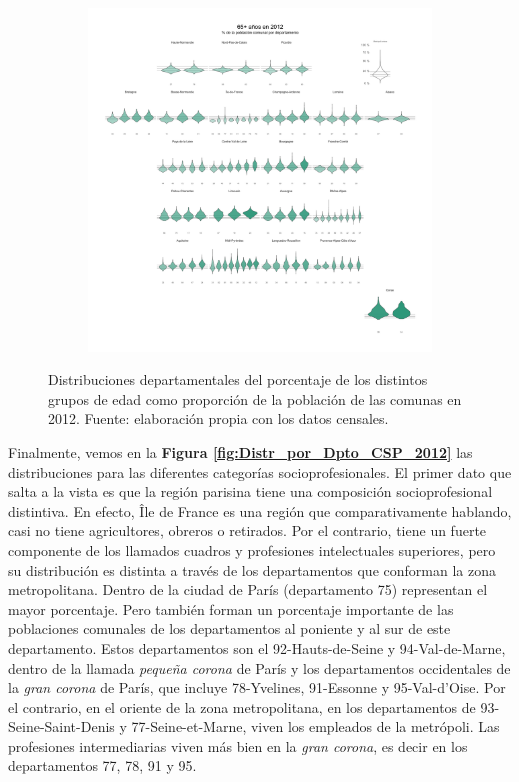 \begin{figure}[h]
\begin{subfigure}{0.3\textwidth}
	\end{subfigure}
	~
	\begin{subfigure}{0.3\textwidth}
	\includegraphics[width = \textwidth]{Figs/AED/Geofacet_Distr_por_Dpto_Ed6_2012}
	\end{subfigure}
	\caption{Distribuciones departamentales del porcentaje de los distintos grupos de edad como proporción de la población de las comunas en 2012. Fuente: elaboración propia con los datos censales.}
	\label{fig:Distr_por_Dpto_Edades_2012}	
\end{figure}

Finalmente, vemos en la \textbf{Figura \ref{fig:Distr_por_Dpto_CSP_2012}} las distribuciones para las diferentes categorías socioprofesionales. El primer dato que salta a la vista es que la región parisina tiene una composición socioprofesional distintiva. En efecto, Île de France es una región que comparativamente hablando, casi no tiene agricultores, obreros o retirados. Por el contrario, tiene un fuerte componente de los llamados cuadros y profesiones intelectuales superiores, pero su distribución es distinta a través de los departamentos que conforman la zona metropolitana. Dentro de la ciudad de París (departamento 75) representan el mayor porcentaje. Pero también forman un porcentaje importante de las poblaciones comunales de los departamentos al poniente y al sur de este departamento.  Estos departamentos son el 92-Hauts-de-Seine y 94-Val-de-Marne, dentro de la llamada \textit{pequeña corona} de París y los departamentos occidentales de la \textit{gran corona} de París, que incluye 78-Yvelines, 91-Essonne y 95-Val-d'Oise. Por el contrario, en el oriente de la zona metropolitana, en los departamentos de 93-Seine-Saint-Denis y 77-Seine-et-Marne, viven los empleados de la metrópoli. Las profesiones intermediarias viven más bien en la \textit{gran corona}, es decir en los departamentos 77, 78, 91 y 95.\\
 
